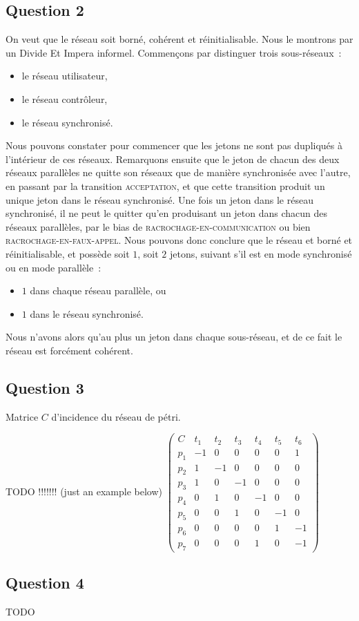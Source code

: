 \subsection*{Question 2}

On veut que le réseau soit borné, cohérent et réinitialisable. Nous le
montrons par un Divide Et Impera informel. Commençons par distinguer
trois sous-réseaux~:
\begin{itemize}
\item le réseau utilisateur,
\item le réseau contrôleur,
\item le réseau synchronisé.
\end{itemize}


Nous pouvons constater pour commencer que les jetons ne sont pas
dupliqués à l'intérieur de ces réseaux. Remarquons ensuite que le
jeton de chacun des deux réseaux parallèles ne quitte son réseaux
que de manière synchronisée avec l'autre, en passant par la transition
\textsc{acceptation}, et que cette transition produit un unique jeton
dans le réseau synchronisé.
Une fois un jeton dans le réseau synchronisé, il ne peut le quitter
qu'en produisant un jeton dans chacun des réseaux parallèles, par le
bias de \textsc{racrochage-en-communication} ou bien
\textsc{racrochage-en-faux-appel}.
Nous pouvons donc conclure que le réseau et borné et réinitialisable,
et possède soit $1$, soit $2$ jetons, suivant s'il est en mode synchronisé ou en mode parallèle~:
\begin{itemize}
\item $1$ dans chaque réseau parallèle, ou 
\item $1$ dans le réseau synchronisé.
\end{itemize} 
Nous n'avons alors qu'au plus un jeton dans chaque sous-réseau, et de
ce fait le réseau est forcément cohérent.

\subsection*{Question 3}

Matrice $C$ d'incidence du réseau de pétri.

TODO !!!!!!! (just an example below)
 $ \begin{pmatrix}
C&t_1&t_2&t_3&t_4&t_5&t_6 \\
p_1& -1&0&0&0&0&1 \\
p_2&1&-1&0&0&0&0 \\
p_3&1&0&-1&0&0&0 \\
p_4&0&1&0&-1&0&0 \\
p_5&0&0&1&0&-1&0 \\
p_6&0&0&0&0&1&-1 \\
p_7&0&0&0&1&0&-1 
\end{pmatrix}$
\subsection*{Question 4}

TODO
